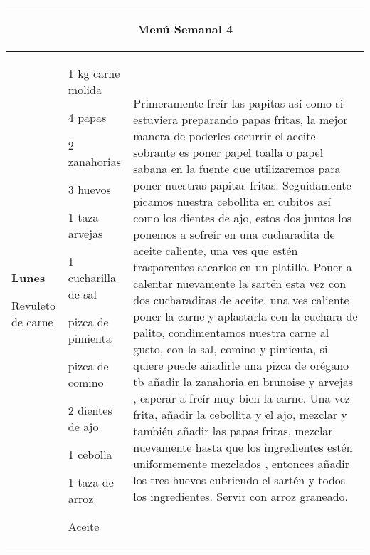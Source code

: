 \documentclass[menu.tex]{subfiles}
\begin{document}
    
\begin{tabular} {p{3.5cm} p{4cm} p{9cm}}
\multicolumn{3}{c}{\begin{LARGE}Menú Semanal 4\end{LARGE}}\\
\hline

\pbox{20cm}
{
    \rule{0pt}{3ex}\begin{large}\textbf{Lunes}\end{large}\\ 
    \rule{0pt}{2ex}Revuleto de carne
} & 
\vspace{-0.3cm}            
\begin{compactitem} 
    \begin{scriptsize}
        \item 1 kg carne molida
        \item 4 papas
        \item 2 zanahorias
        \item 3 huevos
        \item 1 taza arvejas
        \item 1 cucharilla de sal
        \item pizca de pimienta
        \item pizca de comino
        \item 2 dientes de ajo
        \item 1 cebolla
        \item 1 taza de arroz
        \item Aceite
    \end{scriptsize}
\end{compactitem}&
\vspace{-0.3cm}
Primeramente freír las papitas así como si estuviera preparando papas fritas, la mejor manera de poderles escurrir el aceite sobrante es poner papel toalla o papel sabana en la fuente que utilizaremos para poner nuestras papitas fritas. Seguidamente picamos nuestra cebollita en cubitos así como los dientes de ajo, estos dos juntos los ponemos a sofreír en una cucharadita de aceite caliente, una ves que estén trasparentes sacarlos en un platillo. Poner a calentar nuevamente la sartén esta vez con dos cucharaditas de aceite, una ves caliente poner la carne y aplastarla con la cuchara de palito, condimentamos nuestra carne al gusto, con la sal, comino y pimienta, si quiere puede añadirle una pizca de orégano tb añadir la zanahoria en brunoise y arvejas , esperar a freír muy bien la carne. Una vez frita, añadir la cebollita y el ajo, mezclar y también añadir las papas fritas, mezclar nuevamente hasta que los ingredientes estén uniformemente mezclados , entonces añadir los tres huevos cubriendo el sartén y todos los ingredientes. Servir con arroz graneado.\\
\hline


\end{tabular}
\end{document}
